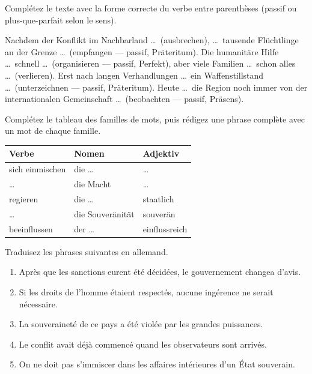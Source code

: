 \documentclass[11pt]{article}
\begin{document}
\begin{exercice}
Complétez le texte avec la forme correcte du verbe entre parenthèses (passif ou plus-que-parfait selon le sens).

\begin{textebox}
Nachdem der Konflikt im Nachbarland \ldots\ (ausbrechen), \ldots\ tausende Flüchtlinge an der Grenze \ldots\ (empfangen — passif, Präteritum). Die humanitäre Hilfe \ldots\ schnell \ldots\ (organisieren — passif, Perfekt), aber viele Familien \ldots\ schon alles \ldots\ (verlieren). Erst nach langen Verhandlungen \ldots\ ein Waffenstillstand \ldots\ (unterzeichnen — passif, Präteritum). Heute \ldots\ die Region noch immer von der internationalen Gemeinschaft \ldots\ (beobachten — passif, Präsens).
\end{textebox}
\end{exercice}

\begin{exercice}
Complétez le tableau des familles de mots, puis rédigez une phrase complète avec un mot de chaque famille.

\begin{center}
\begin{tabularx}{\linewidth}{|l|X|X|}
\hline
\rowcolor{popblueL} Verbe & Nomen & Adjektiv \\
\hline
sich einmischen & die \ldots & \ldots \\
\hline
\ldots & die Macht & \ldots \\
\hline
regieren & die \ldots & staatlich \\
\hline
\ldots & die Souveränität & souverän \\
\hline
beeinflussen & der \ldots & einflussreich \\
\hline
\end{tabularx}
\end{center}
\end{exercice}

\begin{exercice}
Traduisez les phrases suivantes en allemand.
\begin{enumerate}
\item Après que les sanctions eurent été décidées, le gouvernement changea d'avis.
\item Si les droits de l'homme étaient respectés, aucune ingérence ne serait nécessaire.
\item La souveraineté de ce pays a été violée par les grandes puissances.
\item Le conflit avait déjà commencé quand les observateurs sont arrivés.
\item On ne doit pas s'immiscer dans les affaires intérieures d'un État souverain.
\end{enumerate}
\end{exercice}
\end{document}
